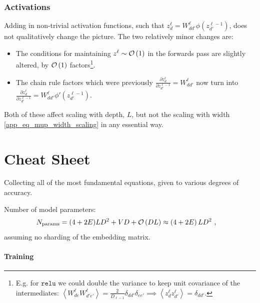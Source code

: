 \documentclass[11pt]{article}
\begin{document}
\subsubsection{Activations}

Adding in non-trivial activation functions, such that $ z^{ \ell }_{ d } = W^{ \ell }_{ dd' }
\phi\left ( z^{ \ell-1 }_{ d' } \right )  $, does not qualitatively change the picture. The two
relatively minor changes are:
\begin{itemize}
    \item The conditions for maintaining $ z^{ \ell }\sim \mathcal{O} \left( 1 \right)  $ in the forwards
        pass are slightly altered, by $ \mathcal{O} \left( 1  \right)  $ factors\footnote{E.g. for $
        \texttt{relu} $ we could double the variance to keep unit covariance of the intermediates: $
        \left\langle W^{ \ell  }_{ de } W^{ \ell }_{
    d'e'  }  \right\rangle = \frac{ 2 }{ D_{ \ell-1  } }\delta_{ dd'  }\delta_{ ee'  }  \implies
\left\langle z^{ \ell  }_{ d }z^{ \ell  }_{ d' } \right\rangle= \delta_{ dd' }$.}.
    \item The chain rule factors which
    were previously $ \frac{ \partial z^{ \ell }_{ d } }{ \partial z^{ \ell-1 }_{ d' } } = W ^{ \ell }_{
    dd' } $ now turn into $ \frac{ \partial z^{ \ell }_{ d } }{ \partial z^{ \ell-1 }_{ d' } } = W ^{ \ell }_{
    dd' }\phi'\left ( z^{ \ell-1 }_{ d' } \right ) $.
\end{itemize}
Both of these affect scaling with depth, $ L $, but not the scaling with width
\eqref{app_eq_mup_width_scaling} in any essential way.









\section{Cheat Sheet \label{app_cheat_sheet}}
Collecting all of the most fundamental equations, given to various degrees of accuracy.

Number of model parameters:
\begin{align}
	N _{ {\rm params} } & =   (4+2E)LD ^{ 2 } + VD+ \mathcal{O} \left( DL \right) \approx   \left ( 4+2E \right )LD ^{ 2 }\ ,
\end{align}
assuming no sharding of the embedding matrix.


\paragraph{Training}
\end{document}
